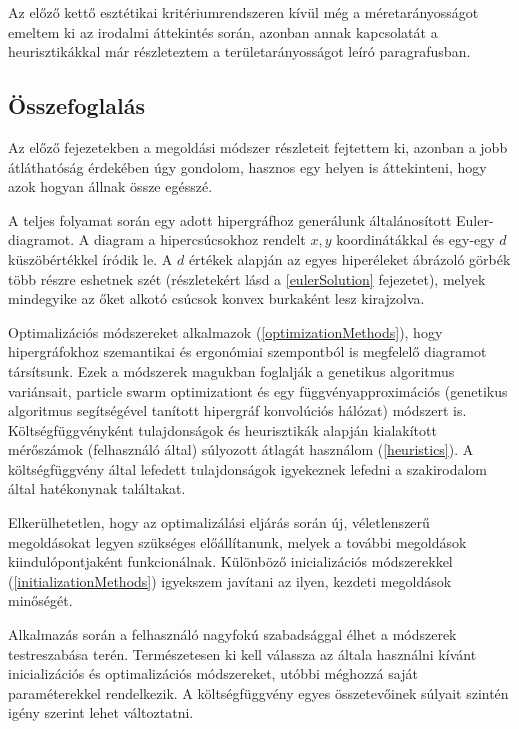 Az előző kettő esztétikai kritériumrendszeren kívül még a méretarányosságot emeltem ki az irodalmi áttekintés során, azonban annak kapcsolatát a heurisztikákkal már részleteztem a területarányosságot leíró paragrafusban.


\subsection{Összefoglalás}

Az előző fejezetekben a megoldási módszer részleteit fejtettem ki, azonban a jobb átláthatóság érdekében úgy gondolom, hasznos egy helyen is áttekinteni, hogy azok hogyan állnak össze egésszé.


A teljes folyamat során egy adott hipergráfhoz generálunk általánosított Euler-diagramot. A diagram a hipercsúcsokhoz rendelt $x,y$ koordinátákkal és egy-egy $d$ küszöbértékkel íródik le. A $d$ értékek alapján az egyes hiperéleket ábrázoló görbék több részre eshetnek szét (részletekért lásd a \ref{eulerSolution} fejezetet), melyek mindegyike az őket alkotó csúcsok konvex burkaként lesz kirajzolva.


Optimalizációs módszereket alkalmazok (\ref{optimizationMethods}), hogy hipergráfokhoz szemantikai és ergonómiai szempontból is megfelelő diagramot társítsunk. Ezek a módszerek magukban foglalják a genetikus algoritmus variánsait, particle swarm optimizationt és egy függvényapproximációs (genetikus algoritmus segítségével tanított hipergráf konvolúciós hálózat) módszert is. Költségfüggvényként tulajdonságok és heurisztikák alapján kialakított mérőszámok (felhasználó által) súlyozott átlagát használom (\ref{heuristics}). A költségfüggvény által lefedett tulajdonságok igyekeznek lefedni a szakirodalom által hatékonynak találtakat.


Elkerülhetetlen, hogy az optimalizálási eljárás során új, véletlenszerű megoldásokat legyen szükséges előállítanunk, melyek a további megoldások kiindulópontjaként funkcionálnak. Különböző inicializációs módszerekkel (\ref{initializationMethods}) igyekszem javítani az ilyen, kezdeti megoldások minőségét.

Alkalmazás során a felhasználó nagyfokú szabadsággal élhet a módszerek testreszabása terén. Természetesen ki kell válassza az általa használni kívánt inicializációs és optimalizációs módszereket, utóbbi méghozzá saját paraméterekkel rendelkezik. A költségfüggvény egyes összetevőinek súlyait szintén igény szerint lehet változtatni.


